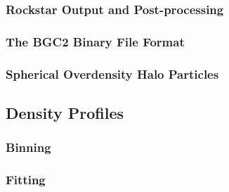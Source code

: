 \subsubsection{Rockstar Output and Post-processing}
\label{subsubsec:output}



\subsubsection{The BGC2 Binary File Format}
\label{subsubsec:bgc2}



\subsubsection{Spherical Overdensity Halo Particles}
\label{subsubsec:spherical_overdensity}




\subsection{Density Profiles}
\label{subsec:denisty_profiles}



\subsubsection{Binning}
\label{subsubsec:binning}



\subsubsection{Fitting}
\label{subsubsec:fitting}



